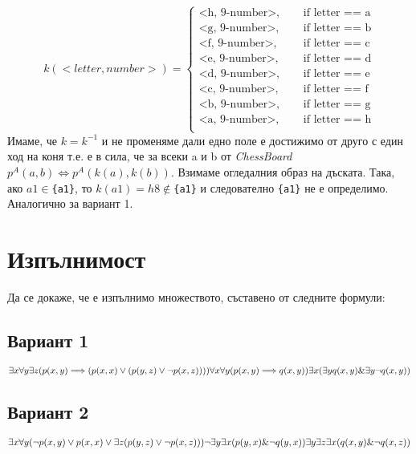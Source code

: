 \documentclass{article}
\begin{document}
\[   
k(<letter, number>) = 
     \begin{cases}
       \text{<h, 9-number>, } &\quad\text{if letter == a}\\
       \text{<g, 9-number>, } &\quad\text{if letter == b}\\
       \text{<f, 9-number>, } &\quad\text{if letter == c}\\
       \text{<e, 9-number>, } &\quad\text{if letter == d}\\
       \text{<d, 9-number>, } &\quad\text{if letter == e}\\
       \text{<c, 9-number>, } &\quad\text{if letter == f}\\
       \text{<b, 9-number>, } &\quad\text{if letter == g}\\
       \text{<a, 9-number>, } &\quad\text{if letter == h}\\
     \end{cases}
\]
Имаме, че $k = k^{-1}$ и не променяме дали едно поле е достижимо от друго с един ход на коня т.е. е в сила, че за всеки a и b от \textit{ChessBoard} \\ $p^A(a, b) \iff p^A(k(a), k(b))$. Взимаме огледалния образ на дъската. Така, ако $a1\in$\texttt{\{a1\}}, то $k(a1)=h8 \notin $\texttt{\{a1\}} и следователно \texttt{\{a1\}} не е определимо. Аналогично за вариант 1.



\newpage
\section{Изпълнимост}
Да се докаже, че е изпълнимо множеството, съставено от следните формули:

\subsection{Вариант 1}

$\exists x \forall y \exists z ( p(x,y) \Longrightarrow (p(x,x) \lor (p(y,z) \lor \neg p(x,z))))\\
\forall x \forall y (p(x,y) \Longrightarrow q(x, y))\\
\exists x (\exists y q(x,y) \& \exists y \neg q(x,y))$

\subsection{Вариант 2}

$\exists x \forall y  ( \neg p(x,y) \lor p(x,x) \lor \exists z(p(y,z) \lor \neg p(x,z)))\\
\neg \exists y \exists x (p(y,x) \& \neg q(y, x))\\
\exists y \exists z \exists x (q(x,y) \& \neg q(x,z))$
\end{document}
